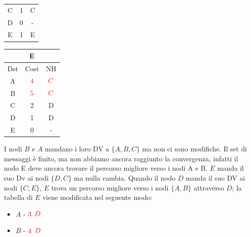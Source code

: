 \documentclass[10pt]{article}
\begin{document}
\begin{table}[h!]
\begin{tabular}{|c||c||c|}
 			C & 1 & C \\
 			D & 0 & - \\
 			E & 1 & E \\
 			\hline
		\end{tabular}
		\begin{tabular}{|c||c||c|}
 			\hline
	 		\multicolumn{3}{|c|}{E} \\
 			\hline
 			Dst & Cost & NH\\
 			\hline
 			A & $\color{red} 4$ & $\color{red} C$ \\
 			B & $\color{red} 5$ & $\color{red} C$ \\
 			C & 2 & D \\
 			D & 1 & D \\
 			E & 0 & - \\
 			\hline
		\end{tabular}
	\end{table}
	\newline \newline
	I nodi $B$ e $A$ mandano i loro DV a $\{A,B,C\}$ ma non ci sono modifiche. Il set di messaggi è finito, ma non abbiamo ancora raggiunto la convergenza, infatti il nodo E deve ancora trovare il percorso migliore verso i nodi A e B.
	\newline \newline $E$ manda il suo Dv ai nodi $\{D,C\}$ ma nulla cambia.
	\newline Quando il nodo $D$ manda il suo DV ai nodi $\{C,E\}$, $E$ trova un percorso migliore verso i nodi $\{A,B\}$ attraverso $D$; la tabella di $E$ viene modificata nel seguente modo:
	\begin{itemize}
		\item $A$ - $\color{red} 3$ $\color{red} D$
		\item $B$ - $\color{red} 4$ $\color{red} D$
	\end{itemize}
	
\end{document}
